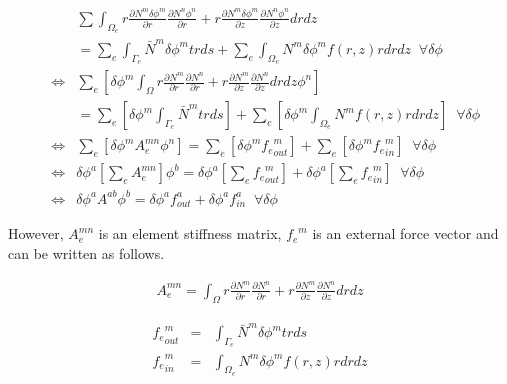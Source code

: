 \begin{eqnarray}
&&\sum\int_{\Omega_e} r\frac{\partial N^m\delta\phi^m}{\partial r}\frac{\partial  N^n\phi^n}{\partial r} + r\frac{\partial N^m\delta\phi^m}{\partial z}\frac{\partial N^n\phi^n}{\partial z} drdz \\
 && = \sum_e\int_{\Gamma_e} \bar{N}^m\delta\phi^m trds + \sum_e\int_{\Omega_e} N^m\delta\phi^m f(r,z) rdrdz\;\;\forall \delta\phi\\
&\Leftrightarrow&  \sum_e\left[\delta\phi^m\int_\Omega r\frac{\partial N^m}{\partial r}\frac{\partial  N^n}{\partial r} + r\frac{\partial N^m}{\partial z}\frac{\partial N^n}{\partial z} drdz\phi^n \right] \\
&& = \sum_e\left[\delta\phi^m \int_{\Gamma_e} \bar{N}^mtrds\right] + \sum_e\left[\delta\phi^m\int_{\Omega_e} N^m f(r,z) rdrdz\right]\;\;\forall \delta\phi\\
&\Leftrightarrow&  \sum_e\left[\delta\phi^m A_e^{mn}\phi^n \right] = \sum_e\left[\delta\phi^m {f_e}_{out}^m\right] + \sum_e\left[\delta\phi^m{f_e}_{in}^m\right]\;\;\forall \delta\phi\\
&\Leftrightarrow&  \delta\phi^a\left[ \sum_e A_e^{mn} \right]\phi^b = \delta\phi^a\left[ \sum_e {f_e}_{out}^m\right] + \delta\phi^a\left[ \sum_e {f_e}_{in}^m\right]\;\;\forall \delta\phi\\
&\Leftrightarrow&  \delta\phi^aA^{ab}\phi^b = \delta\phi^a f_{out}^a + \delta\phi^a f_{in}^a\;\;\forall \delta\phi
\end{eqnarray}


However, $A_e^{mn}$ is an element stiffness matrix, ${f_e}^m$ is an external force vector and can be written as follows.

\begin{tcolorbox}[title=element wise stiffness matrix]
\begin{eqnarray}
A_e^{mn}=\int_\Omega r\frac{\partial N^m}{\partial r}\frac{\partial  N^n}{\partial r} + r\frac{\partial N^m}{\partial z}\frac{\partial N^n}{\partial z} drdz
\end{eqnarray}
\end{tcolorbox}

\begin{tcolorbox}[title=external force]
\begin{eqnarray}
{f_e}_{out}^m &=& \int_{\Gamma_e} \bar{N}^m\delta\phi^m trds\\
{f_e}_{in}^m &=& \int_{\Omega_e} N^m\delta\phi^m f(r,z) rdrdz
\end{eqnarray}
\end{tcolorbox}



